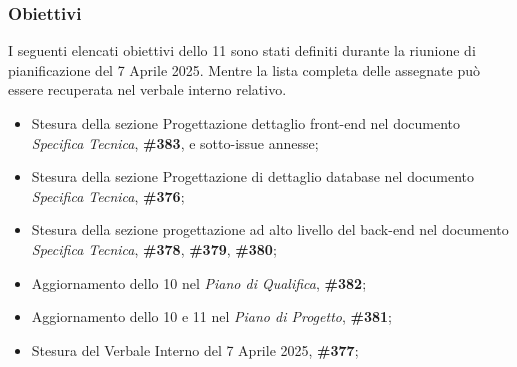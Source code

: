 \subsubsection{Obiettivi}
\label{sec:obiettivi_sprint11}

I seguenti elencati obiettivi dello  11 sono stati definiti durante la riunione di pianificazione del 7 Aprile 2025.
Mentre la lista completa delle  assegnate può essere recuperata nel verbale interno relativo.

\begin{itemize}
    \item Stesura della sezione Progettazione dettaglio front-end nel documento \textit{Specifica Tecnica},  \textbf{\#383}, e sotto-issue annesse;
    \item Stesura della sezione Progettazione di dettaglio database nel documento \textit{Specifica Tecnica},  \textbf{\#376};
    \item Stesura della sezione progettazione ad alto livello del back-end nel documento \textit{Specifica Tecnica},  \textbf{\#378}, \textbf{\#379}, \textbf{\#380};
    \item Aggiornamento dello  10 nel \textit{Piano di Qualifica},  \textbf{\#382};
    \item Aggiornamento dello  10 e 11 nel \textit{Piano di Progetto},  \textbf{\#381};
    \item Stesura del Verbale Interno del 7 Aprile 2025,  \textbf{\#377};
\end{itemize}